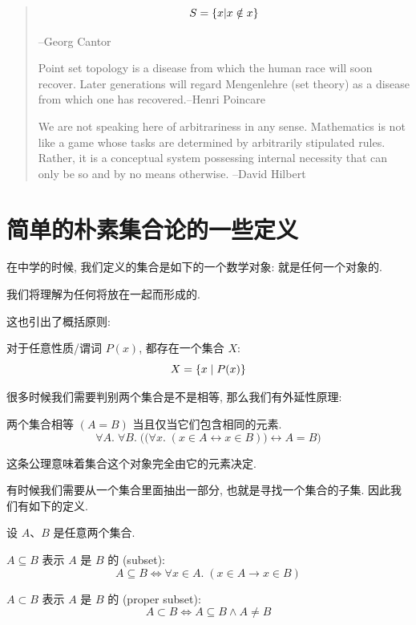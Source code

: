 \begin{quote}
	$$S=\{x|x\notin x\}$$
	
	\hfill --Georg Cantor

	Point set topology is a disease from which the human race will soon recover. Later generations will regard Mengenlehre (set theory) as a disease from which one has recovered.\hfill --Henri Poincare
	
	We are not speaking here of arbitrariness in any sense. Mathematics is not like a game whose tasks are determined by arbitrarily stipulated rules. Rather, it is a conceptual system possessing internal necessity that can only be so and by no means otherwise. \hfill --David Hilbert
\end{quote}

\section{简单的朴素集合论的一些定义}

在中学的时候, 我们定义的集合是如下的一个数学对象: 就是任何一个对象的. 

\begin{definition}[集合]
    我们将理解为任何将放在一起而形成的. 
\end{definition}

这也引出了概括原则: 

\begin{theorem}[概括原则]
    对于任意性质/谓词 $P(x)$, 都存在一个集合 $X$:
    \[
      X = \{x \mid P(x)\}
    \]
\end{theorem}

很多时候我们需要判别两个集合是不是相等, 那么我们有外延性原理: 
\begin{definition}
    两个集合相等 $(A = B)$ 当且仅当它们包含相同的元素. 
    \[
      \forall A.\; \forall B.\;
        \Big(\big(\forall x.\; (x \in A \leftrightarrow x \in B)\big)
          \leftrightarrow A = B \Big)
    \]
\end{definition}

这条公理意味着集合这个对象完全由它的元素决定. 

有时候我们需要从一个集合里面抽出一部分, 也就是寻找一个集合的子集. 因此我们有如下的定义. 

\begin{definition}[子集]
    设 $A$、$B$ 是任意两个集合. 

    $A \subseteq B$ 表示 $A$ 是 $B$ 的 (subset):
    \[
      A \subseteq B \iff \forall x \in A.\; (x \in A \to x \in B)
    \]

    $A \subset B$ 表示 $A$ 是 $B$ 的 (proper subset):
    \[
      A \subset B \iff A \subseteq B \land A \neq B
    \]
\end{definition}

